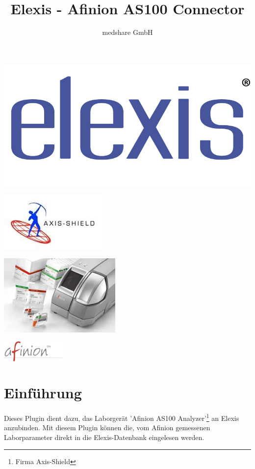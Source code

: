 \documentclass[a4paper]{scrartcl}
\title{Elexis - Afinion AS100 Connector}
\author{medshare GmbH}
\begin{document}
\maketitle
	\begin{center}
		\includegraphics{elexis_logo}
	\end{center}
	\begin{center}
		\includegraphics{axis-shield_logo}
	\end{center}
	\begin{center}
		\includegraphics{afinion_device}
	\end{center}
	\begin{center}
		\includegraphics{afinion_logo}
	\end{center}
\pagebreak

\section{Einf\"uhrung}
Dieses Plugin dient dazu, das Laborger\"at 'Afinion AS100 Analyzer'\footnote{Firma Axis-Shield} an Elexis anzubinden. Mit diesem Plugin k\"onnen die, vom Afinion gemessenen Laborparameter direkt in die Elexis-Datenbank eingelesen werden.
\end{document}
